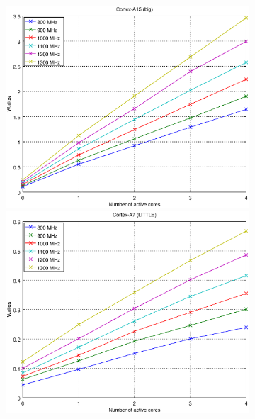 \begin{figure}
  \centering
    \begin{subfigure}{0.45\textwidth}
      \centering

      \begin{framed}
        \includegraphics[width=1\linewidth]{Plots/Modelos_consumo/odroid_big.eps}
        \includegraphics[width=1\linewidth]{Plots/Modelos_consumo/odroid_little.eps}
      \end{framed}
      \caption{\odroid}
      \label{fig:modelo_consumo-odroid}


\end{subfigure}
\end{figure}
